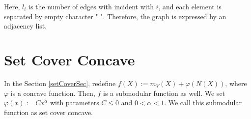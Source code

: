 \documentclass{article}
\begin{document}
Here, $l_i$ is the number of edges with incident with $i$,
and each element is separated by empty character " ".
Therefore, the graph is expressed by an adjacency list.



\section{Set Cover Concave}\label{setCoverConcaveSec}
In the Section \ref{setCoverSec},
redefine $f(X):=m_V(X)+\varphi(N(X))$,
where $\varphi$ is a concave function.
Then,
$f$ is a submodular function as well.
We set $\varphi(x):=C x^\alpha$ with parameters
$C\leq 0$ and $0<\alpha <1$.
We call this submodular function as set cover concave.






\end{document}
